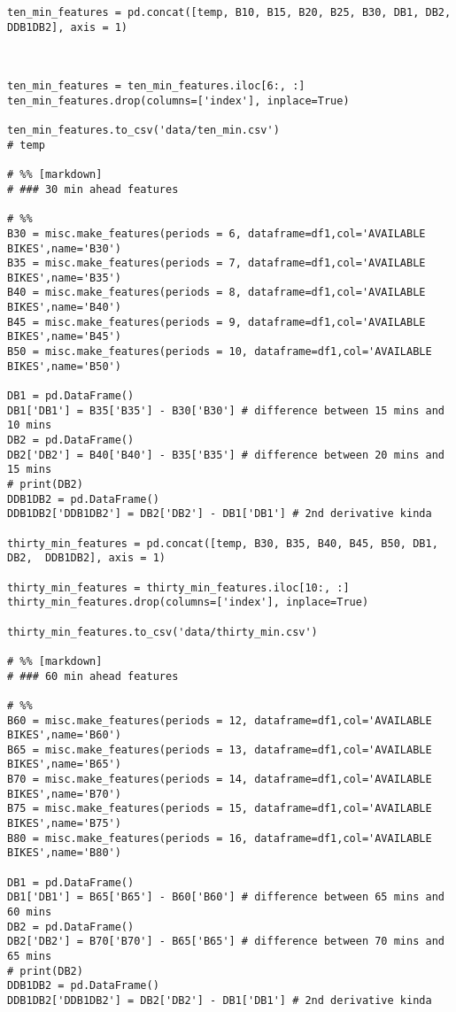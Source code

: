 \begin{verbatim}
ten_min_features = pd.concat([temp, B10, B15, B20, B25, B30, DB1, DB2,  DDB1DB2], axis = 1)



ten_min_features = ten_min_features.iloc[6:, :]
ten_min_features.drop(columns=['index'], inplace=True)

ten_min_features.to_csv('data/ten_min.csv')
# temp

# %% [markdown]
# ### 30 min ahead features

# %%
B30 = misc.make_features(periods = 6, dataframe=df1,col='AVAILABLE BIKES',name='B30')
B35 = misc.make_features(periods = 7, dataframe=df1,col='AVAILABLE BIKES',name='B35')
B40 = misc.make_features(periods = 8, dataframe=df1,col='AVAILABLE BIKES',name='B40')
B45 = misc.make_features(periods = 9, dataframe=df1,col='AVAILABLE BIKES',name='B45')
B50 = misc.make_features(periods = 10, dataframe=df1,col='AVAILABLE BIKES',name='B50')

DB1 = pd.DataFrame()
DB1['DB1'] = B35['B35'] - B30['B30'] # difference between 15 mins and 10 mins
DB2 = pd.DataFrame()
DB2['DB2'] = B40['B40'] - B35['B35'] # difference between 20 mins and 15 mins
# print(DB2)
DDB1DB2 = pd.DataFrame()
DDB1DB2['DDB1DB2'] = DB2['DB2'] - DB1['DB1'] # 2nd derivative kinda

thirty_min_features = pd.concat([temp, B30, B35, B40, B45, B50, DB1, DB2,  DDB1DB2], axis = 1)

thirty_min_features = thirty_min_features.iloc[10:, :]
thirty_min_features.drop(columns=['index'], inplace=True)

thirty_min_features.to_csv('data/thirty_min.csv')

# %% [markdown]
# ### 60 min ahead features

# %%
B60 = misc.make_features(periods = 12, dataframe=df1,col='AVAILABLE BIKES',name='B60')
B65 = misc.make_features(periods = 13, dataframe=df1,col='AVAILABLE BIKES',name='B65')
B70 = misc.make_features(periods = 14, dataframe=df1,col='AVAILABLE BIKES',name='B70')
B75 = misc.make_features(periods = 15, dataframe=df1,col='AVAILABLE BIKES',name='B75')
B80 = misc.make_features(periods = 16, dataframe=df1,col='AVAILABLE BIKES',name='B80')

DB1 = pd.DataFrame()
DB1['DB1'] = B65['B65'] - B60['B60'] # difference between 65 mins and 60 mins
DB2 = pd.DataFrame()
DB2['DB2'] = B70['B70'] - B65['B65'] # difference between 70 mins and 65 mins
# print(DB2)
DDB1DB2 = pd.DataFrame()
DDB1DB2['DDB1DB2'] = DB2['DB2'] - DB1['DB1'] # 2nd derivative kinda


\end{verbatim}
